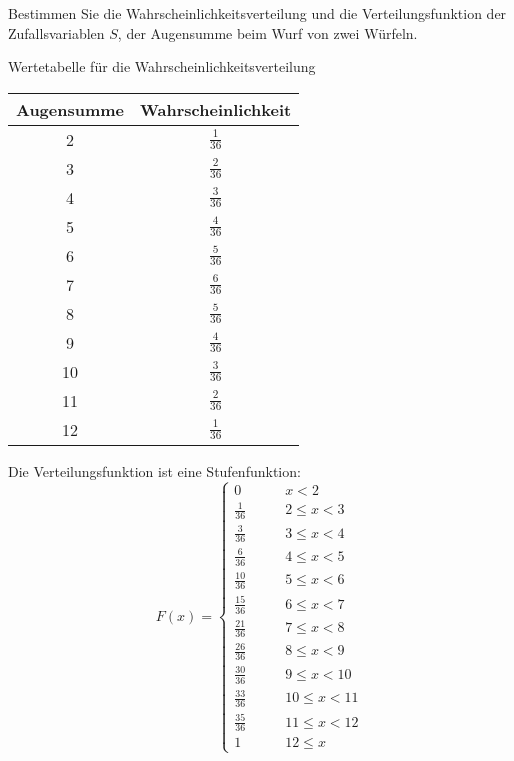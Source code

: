Bestimmen Sie die Wahrscheinlichkeitsverteilung und die
Verteilungsfunktion der Zufallsvariablen $S$, der Augensumme
beim Wurf von zwei Würfeln.


\begin{loesung}
Wertetabelle für die Wahrscheinlichkeitsverteilung
\begin{center}
\begin{tabular}{|c|c|}
\hline
Augensumme&Wahrscheinlichkeit\\
\hline
2&$\frac{1}{36}$\\
3&$\frac{2}{36}$\\
4&$\frac{3}{36}$\\
5&$\frac{4}{36}$\\
6&$\frac{5}{36}$\\
7&$\frac{6}{36}$\\
8&$\frac{5}{36}$\\
9&$\frac{4}{36}$\\
10&$\frac{3}{36}$\\
11&$\frac{2}{36}$\\
12&$\frac{1}{36}$\\
\hline
\end{tabular}
\end{center}
Die Verteilungsfunktion ist eine Stufenfunktion:
\[
F(x)=
\begin{cases}
0            &\qquad x < 2\\
\frac{1}{36} &\qquad 2 \le x < 3\\
\frac{3}{36} &\qquad 3 \le x < 4\\
\frac{6}{36} &\qquad 4 \le x < 5\\
\frac{10}{36}&\qquad 5 \le x < 6\\
\frac{15}{36}&\qquad 6 \le x < 7\\
\frac{21}{36}&\qquad 7 \le x < 8\\
\frac{26}{36}&\qquad 8 \le x < 9\\
\frac{30}{36}&\qquad 9 \le x < 10\\
\frac{33}{36}&\qquad 10 \le x < 11\\
\frac{35}{36}&\qquad 11 \le x < 12\\
1            &\qquad 12 \le x
\end{cases}
\]
\end{loesung}

